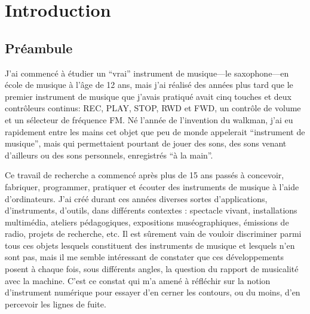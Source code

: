 %
\chapter{Introduction}
\label{ch:introduction}
%


\section{Préambule}


J'ai commencé à étudier un ``vrai'' instrument de musique—le saxophone—en école de musique à l'âge de 12 ans, mais j'ai réalisé des années plus tard que le premier instrument de musique que j'avais pratiqué avait cinq touches et deux contrôleurs continus: REC, PLAY, STOP, RWD et FWD, un contrôle de volume et un sélecteur de fréquence FM. Né l'année de l'invention du walkman, j'ai eu rapidement entre les mains cet objet que peu de monde appelerait ``instrument de musique'', mais qui permettaient pourtant de jouer des sons, des sons venant d'ailleurs ou des sons personnels, enregistrés ``à la main''.\\


Ce travail de recherche a commencé après plus de 15 ans passés à concevoir, fabriquer, programmer, pratiquer et écouter des instruments de musique à l'aide d'ordinateurs. J'ai créé durant ces années diverses sortes d'applications, d'instruments, d'outils, dans différents contextes : spectacle vivant, installations multimédia, ateliers pédagogiques, expositions muséographiques, émissions de radio, projets de recherche, etc. Il est sûrement vain de vouloir discriminer parmi tous ces objets lesquels constituent des instruments de musique et lesquels n'en sont pas, mais il me semble intéressant de constater que ces développements posent à chaque fois, sous différents angles, la question du rapport de musicalité avec la machine.
C'est ce constat qui m'a amené à réfléchir sur la notion d'instrument numérique pour essayer d'en cerner les contours, ou du moins, d'en percevoir les lignes de fuite.

